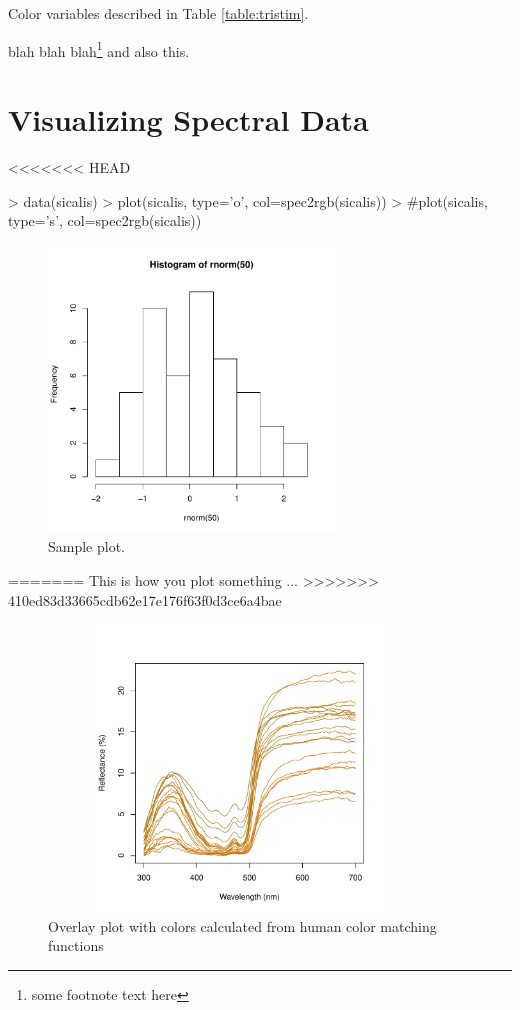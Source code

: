 \documentclass{article}
\begin{document}
Color variables described in Table \ref{table:tristim}.

blah blah blah\footnote{some footnote text here} and also this.

\section{Visualizing Spectral Data}

<<<<<<< HEAD
\begin{Schunk}
\begin{Sinput}
> data(sicalis)
> plot(sicalis, type='o', col=spec2rgb(sicalis))
> #plot(sicalis, type='s', col=spec2rgb(sicalis))
\end{Sinput}
\end{Schunk}

\begin{figure} %
\begin{center}
\includegraphics[width=3in]{pavo-fig1}
\end{center}
\caption{Sample plot.}
\label{fig1}
\end{figure}

=======
This is how you plot something ...
>>>>>>> 410ed83d33665cdb62e17e176f63f0d3ce6a4bae

\begin{figure} %
\begin{center}
\includegraphics[width=4in, height=3in]{pavo-overlay}
\end{center}
\caption{Overlay plot with colors calculated from human color matching functions}
\label{figure:overlay}
\end{figure}
\end{document}
